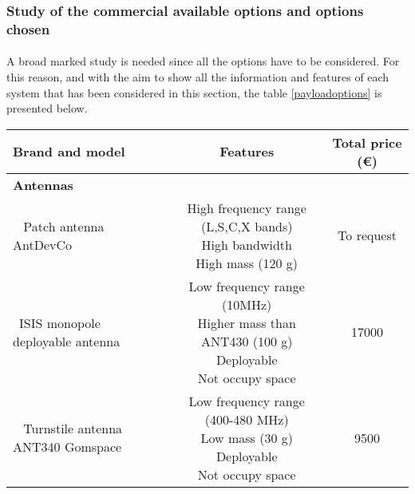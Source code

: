 \subsubsection{Study of the commercial available options and options chosen}
\paragraph{}A broad marked study is needed since all the options have to be considered. For this reason, and with the aim to show all the information and features of each system that has been considered in this section, the table \ref{payloadoptions} is presented below.

\begin{longtable}{| l | c | c | }
\hline
\rowcolor[gray]{0.80}	\textbf{Brand and model} &  \textbf{Features}     & \textbf{Total price (\euro)}   \\
\hline
\endfirsthead

\rowcolor[gray]{0.85} \textbf{Antennas} &  &  \\
	   ~	Patch antenna AntDevCo & \makecell{High frequency range (L,S,C,X bands)\\ High bandwidth \\High mass (120 g)} & To request \\
	   \hline
	  ~ISIS monopole deployable antenna & \makecell{Low frequency range (10MHz) \\ Higher mass than ANT430 (100 g) \\ Deployable \\ Not occupy space} & 17000 \\
	   \hline
	  ~	Turnstile antenna ANT340 Gomspace & \makecell{Low frequency range (400-480 MHz) \\ Low mass (30 g) \\ Deployable \\ Not occupy space} & 9500 \\
	   \hline
	\hline


\end{longtable}
